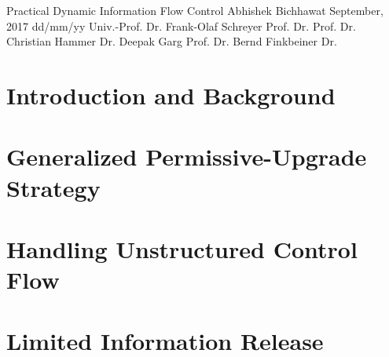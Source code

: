 \documentclass[a4paper,10pt,twoside,openright]{book}
\begin{document}
\frontmatter

\ThesisTitle
    {Practical Dynamic Information Flow Control} %
    {Abhishek Bichhawat}               %
    {September, 2017}                  %
    {dd/mm/yy}	 %
    {Univ.-Prof. Dr. Frank-Olaf Schreyer}		%
    {Prof. Dr. }		%
    {Prof. Dr. Christian Hammer}                %
    {Dr. Deepak Garg}            %
    {Prof. Dr. Bernd Finkbeiner}						%
    {Dr. }						%




\pagestyle{empty}
\cleardoublepage

\cleardoublepage

% 
\cleardoublepage


\cleardoublepage


\pagestyle{fancyplain} %
\tableofcontents
{}


\mainmatter\setcounter{page}{1}

\cleardoublepage
\part{Introduction and Background}
\cleardoublepage


% 

\cleardoublepage
\part{Generalized Permissive-Upgrade Strategy}
\cleardoublepage



\cleardoublepage
\part{Handling Unstructured Control Flow} 
\cleardoublepage


\cleardoublepage
\part{Limited Information Release}
\cleardoublepage

\end{document}
